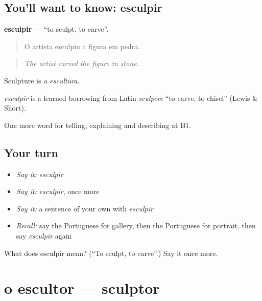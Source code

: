 \subsection*{You'll want to know: esculpir}
\textbf{esculpir} — \textquotedblleft{}to sculpt, to carve\textquotedblright{}.

\begin{quote}
O artista esculpiu a figura em pedra.
\end{quote}

\begin{quote}
\emph{The artist carved the figure in stone.}
\end{quote}

Sculpture is \emph{a escultura}.

\begin{cousinweb}
\emph{esculpir} is a learned borrowing from Latin \emph{sculpere} \textquotedblleft{}to carve, to chisel\textquotedblright{} (Lewis \& Short).
\end{cousinweb}

\begin{grammarlens}[title={What you've built}]
One more word for telling, explaining and describing at B1.
\end{grammarlens}

\subsection*{Your turn}
\begin{itemize}
\raggedright
  \item \emph{Say it:} \emph{esculpir}
  \item \emph{Say it:} \emph{esculpir}, once more
  \item \emph{Say it:} a sentence of your own with \emph{esculpir}
  \item \emph{Recall:} say the Portuguese for gallery, then the Portuguese for portrait, then say \emph{esculpir} again
\end{itemize}

\begin{tcolorbox}[breakable,colback=teal!4,colframe=teal!35!black,title={Before you move on}]
What does esculpir mean? (\textquotedblleft{}To sculpt, to carve\textquotedblright{}.) Say it once more.
\end{tcolorbox}
\section[o escultor]{o escultor — sculptor}

